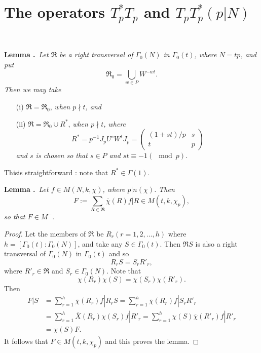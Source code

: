 \section{The operators $T^{*}_{p}T_{p}$ and $T_{p}T^{*}_{p}(p|N)$}\label{art10-sec8}
~

\medskip
\noindent
{\bf Lemma .\label{art10-lem8.1}}~{\em Let $\mathfrak{R}$ be a right transversal of $\Gamma_{0}(N)$ in $\Gamma_{0}(t)$, where $N=tp$, and put}
\setcounter{equation}{0}
\begin{equation}
\mathfrak{R}_{0}=\bigcup\limits_{w\in P}W^{-wt}.
\end{equation}
{\em Then we may take}
\begin{itemize}
\item[(i)] $\mathfrak{R}=\mathfrak{R}_{0}$, {\em when $p\nmid t$, and}

\item[(ii)] $\mathfrak{R}=\mathfrak{R}_{0}\cup R^{*}$, {\em when $p\nmid t$, where}
\begin{equation}
R^{*}=p^{-1}J_{p}U^{s}W^{t}J_{p}=
\left(
\begin{matrix}
(1+st)/p & s\\
t & p
\end{matrix}
\right)\label{art10-eq8.2}
\end{equation}
{\em and $s$ is chosen so that $s\in P$ and $st\equiv -1(\mod p)$.}
\end{itemize}

This\pageoriginale is straightforward : note that $R^{*}\in \Gamma(1)$.

\medskip
\noindent
{\bf Lemma .\label{art10-lem8.2}}~{\em Let $f\in M(N,k,\chi)$, where $p|n(\chi)$. Then}
$$
F:=\sum\limits_{R\in \mathfrak{R}}\overline{\chi}(R)f|R\in M(t,k,\chi_{p}),
$$
{\em so that $F\in M^{-}$.}

\begin{proof}
Let the members of $\mathfrak{R}$ be $R_{r}(r=1,2,\ldots,h)$ where $h=[\Gamma_{0}(t):\Gamma_{0}(N)]$, and take any $S\in \Gamma_{0}(t)$. Then $\mathfrak{R}S$ is also a right transversal of $\Gamma_{0}(N)$ in $\Gamma_{0}(t)$ and so
$$
R_{r}S=S_{r}R'_{r},
$$
where $R'_{r}\in \mathfrak{R}$ and $S_{r}\in \Gamma_{0}(N)$. Note that
$$
\chi(R_{r})\chi(S)=\chi(S_{r})\chi(R'_{r}).
$$
Then
\begin{align*}
F|S &= \sum\limits^{h}_{r=1}\overline{\chi}(R_{r})f|R_{r}S=\sum\limits^{h}_{r=1}\overline{\chi}(R_{r})f|S_{r}R'_{r}\\[3pt]
&= \sum\limits^{h}_{r=1}\overline{X}(R_{r})\chi(S_{r})f|R'_{r}=\sum\limits^{h}_{r=1}\chi(S)\overline{\chi}(R'_{r})f|R'_{r}\\[3pt]
&= \chi(S)F.
\end{align*}
It follows that $F\in M(t,k,\chi_{p})$ and this proves the lemma.
\end{proof}


